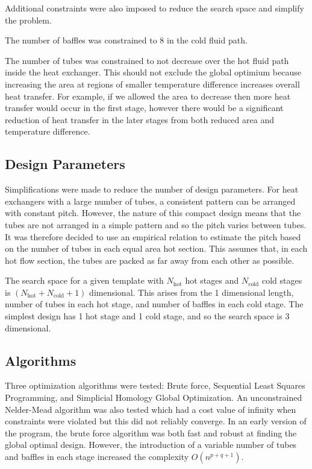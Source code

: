 \documentclass{article}
\begin{document}
Additional constraints were also imposed to reduce the search space and simplify the problem.

The number of baffles was constrained to 8 in the cold fluid path. %

The number of tubes was constrained to not decrease over the hot fluid path inside the heat exchanger.
This should not exclude the global optimium because increasing the area at regions of smaller temperature difference increases overall heat transfer.
For example, if we allowed the area to decrease then more heat transfer would occur in the first stage,
however there would be a significant reduction of heat transfer in the later stages from both reduced area and temperature difference.

\subsection{Design Parameters}

Simplifications were made to reduce the number of design parameters.
For heat exchangers with a large number of tubes, a consistent pattern can be arranged with constant pitch.
However, the nature of this compact design means that the tubes are not arranged in a simple pattern and so the pitch varies between tubes.
It was therefore decided to use an empirical relation to estimate the pitch based on the number of tubes in each equal area hot section.
This assumes that, in each hot flow section, the tubes are packed as far away from each other as possible.

The search space for a given template with $N_\text{hot}$ hot stages and $N_\text{cold}$ cold stages is $(N_\text{hot} + N_\text{cold} + 1)$ dimensional.
This arises from the 1 dimensional length, number of tubes in each hot stage, and number of baffles in each cold stage.
The simplest design has 1 hot stage and 1 cold stage, and so the search space is 3 dimensional.

\subsection{Algorithms}
Three optimization algorithms were tested: Brute force, Sequential Least Squares Programming, and Simplicial Homology Global Optimization.
An unconstrained Nelder-Mead algorithm was also tested which had a cost value of infinity when constraints were violated but this did not reliably converge.
In an early version of the program, the brute force algorithm was both fast and robust at finding the global optimal design.
However, the introduction of a variable number of tubes and baffles in each stage increased the complexity $O(n^{p+q+1})$.
\end{document}
